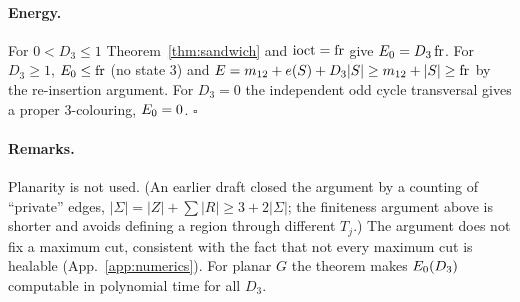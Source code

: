 \paragraph*{Energy.} For $0<D_3\le1$ Theorem~\ref{thm:sandwich} and $\operatorname{ioct}=\operatorname{fr}$ give
$E_0=D_3\operatorname{fr}$. For $D_3\ge1$, $E_0\le\operatorname{fr}$ (no state 3) and
$E=m_{12}+e(S)+D_3|S|\ge m_{12}+|S|\ge\operatorname{fr}$ by the re-insertion argument. For $D_3=0$ the
independent odd cycle transversal gives a proper 3-colouring, $E_0=0$. \hfill$\square$

\paragraph*{Remarks.} Planarity is not used. (An earlier draft closed the argument by a
counting of ``private'' edges, $|\Sigma|=|Z|+\sum|R|\ge3+2|\Sigma|$; the finiteness argument above
is shorter and avoids defining a region through different $T_j$.) The argument does not fix a maximum cut, consistent
with the fact that not every maximum cut is healable (App.~\ref{app:numerics}). For planar $G$ the
theorem makes $E_0(D_3)$ computable in polynomial time for all $D_3$.
